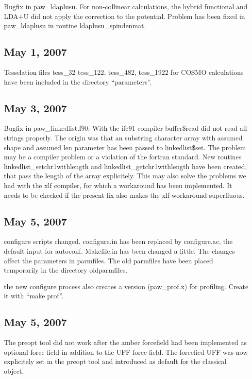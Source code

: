 \documentclass[final,12pt]{article}
\begin{document}
Bugfix in paw\_ldaplusu. For non-collinear calculations, 
the hybrid functional and LDA+U did not apply the correction to the potential. 
Problem has been fixed in paw\_ldaplusu in routine ldaplusu\_spindenmat. 

\subsection{May 1,  2007}

Tesselation files tess\_32 tess\_122, tess\_482, tess\_1922 for COSMO
calculations have been included in the directory ``parameters''.

\subsection{May 3,  2007}

Bugfix in paw\_linkedlist.f90: With the ifc91 compiler buffer\$read did
not read all strings properly. The origin was that an substring
character array with assumed shape and assumed len parameter has been
passed to linkedlist\$set.  The problem may be a compiler problem or a
violation of the fortran standard. New routines
linkedlist\_setchr1withlength and linkedlist\_getchr1withlength have
been created, that pass the length of the array explicitely. This may
also solve the problems we had with the xlf compiler, for which a
workaround has been implemented. It needs to be checked if the present
fix also makes the xlf-workaround superfluous.

\subsection{May 5,  2007}

configure scripts changed. configure.in has been replaced by
configure.ac, the default input for autoconf. Makefile.in has been
changed a little. The changes affect the parameters in parmfiles. The
old parmfiles have been placed temporarily in the directory
oldparmfiles.

the new configure process also creates a version (paw\_prof.x) for
profiling. Create it with ``make prof''.

\subsection{May 5,  2007}

The preopt tool did not work after the amber forcefield had been
implemented as optional force field in addition to the UFF force
field. The forcefied UFF was now explicitely set in the preopt tool
and introduced as default for the classical object.
\end{document}
